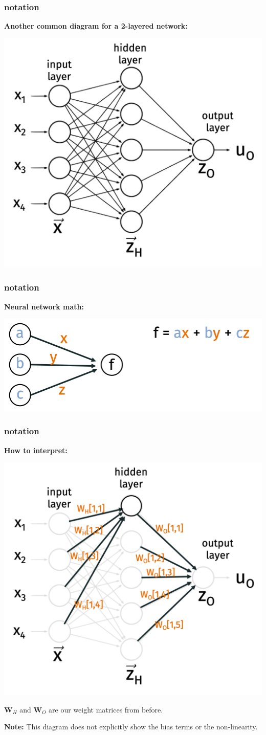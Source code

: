 \documentclass[handout,compress]{beamer}
\newcommand{\bv}[1]{\mathbf{#1}}
\begin{document}
\begin{frame}
	\frametitle{notation}
	\textbf{Another common diagram for a 2-layered network:}
	\begin{center}
		\includegraphics[width=.6\textwidth]{noweights.png}
	\end{center}
\end{frame}

\begin{frame}
	\frametitle{notation}
	\textbf{Neural network math:}
	\begin{center}
		\includegraphics[width=.6\textwidth]{neural_math.png}
	\end{center}
\end{frame}

\begin{frame}
	\frametitle{notation}
	\textbf{How to interpret:}
	\vspace{-1em}
	\begin{center}
		\includegraphics[width=.6\textwidth]{weights1.png}
	\end{center}
\vspace{-1.5em}
$\bv{W}_H$ and $\bv{W}_O$ are our weight matrices from before. 

\textbf{Note:} This diagram does not explicitly show the bias terms or the non-linearity. 
\end{frame}
\end{document}
